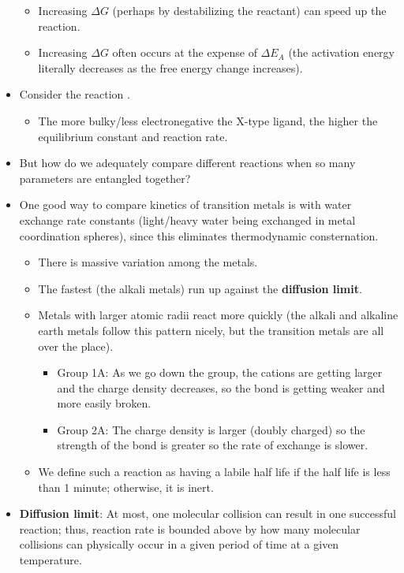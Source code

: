 \documentclass[../notes.tex]{subfiles}
\begin{document}
\begin{itemize}
    \begin{itemize}
        \item Increasing $\Delta G$ (perhaps by destabilizing the reactant) can speed up the reaction.
        \item Increasing $\Delta G$ often occurs at the expense of $\Delta E_A$ (the activation energy literally decreases as the free energy change increases).
    \end{itemize}
    \item Consider the reaction .
    \begin{itemize}
        \item The more bulky/less electronegative the X-type ligand, the higher the equilibrium constant and reaction rate.
    \end{itemize}
    \item But how do we adequately compare different reactions when so many parameters are entangled together?
    \item One good way to compare kinetics of transition metals is with water exchange rate constants (light/heavy water being exchanged in metal coordination spheres), since this eliminates thermodynamic consternation.
    \begin{itemize}
        \item There is massive variation among the metals.
        \item The fastest (the alkali metals) run up against the \textbf{diffusion limit}.
        \item Metals with larger atomic radii react more quickly (the alkali and alkaline earth metals follow this pattern nicely, but the transition metals are all over the place).
        \begin{itemize}
            \item Group 1A: As we go down the group, the cations are getting larger and the charge density decreases, so the  bond is getting weaker and more easily broken.
            \item Group 2A: The charge density is larger (doubly charged) so the strength of the bond is greater so the rate of exchange is slower.
        \end{itemize}
        \item We define such a reaction as having a labile half life if the half life is less than 1 minute; otherwise, it is inert.
    \end{itemize}
    \item \textbf{Diffusion limit}: At most, one molecular collision can result in one successful reaction; thus, reaction rate is bounded above by how many molecular collisions can physically occur in a given period of time at a given temperature.

\end{itemize}
\end{document}
